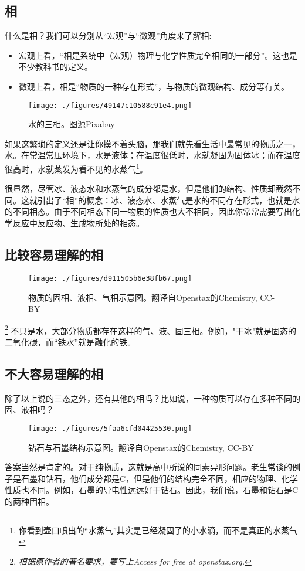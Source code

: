 
\subsection{相}
什么是相？我们可以分别从“宏观”与“微观”角度来了解相:
\begin{itemize}
\item 宏观上看，“相是系统中（宏观）物理与化学性质完全相同的一部分”。这也是不少教科书的定义。
\item 微观上看，相是“物质的一种存在形式”，与物质的微观结构、成分等有关。
\end{itemize}

\begin{figure}[ht]
\centering
\texttt{[image: ./figures/49147c10588c91e4.png]}
\caption{水的三相。图源Pixabay} \label{fig_PHS_1}
\end{figure}
如果这繁琐的定义还是让你摸不着头脑，那我们就先看生活中最常见的物质之一，水。在常温常压环境下，水是液体；在温度很低时，水就凝固为固体冰；而在温度很高时，水就蒸发为看不见的水蒸气\footnote{你看到壶口喷出的“水蒸气”其实是已经凝固了的小水滴，而不是真正的水蒸气}。

很显然，尽管冰、液态水和水蒸气的成分都是水，但是他们的结构、性质却截然不同。这就引出了“相”的概念：冰、液态水、水蒸气是水的不同存在形式，也就是水的不同相态。由于不同相态下同一物质的性质也大不相同，因此你常常需要写出化学反应中反应物、生成物所处的相态。

\subsection{比较容易理解的相}
\begin{figure}[ht]
\centering
\texttt{[image: ./figures/d911505b6e38fb67.png]}
\caption{物质的固相、液相、气相示意图。翻译自Openstax的Chemistry, CC-BY} \label{fig_PHS_2}
\end{figure}
\footnote{\textsl{根据原作者的著名要求，要写上Access for free at openstax.org.}}
不只是水，大部分物质都存在这样的气、液、固三相。例如，"干冰"就是固态的二氧化碳，而“铁水”就是融化的铁。

\subsection{不大容易理解的相}
除了以上说的三态之外，还有其他的相吗？比如说，一种物质可以存在多种不同的固、液相吗？

\begin{figure}[ht]
\centering
\texttt{[image: ./figures/5faa6cfd04425530.png]}
\caption{钻石与石墨结构示意图。翻译自Openstax的Chemistry, CC-BY} \label{fig_PHS_3}
\end{figure}
答案当然是肯定的。对于纯物质，这就是高中所说的同素异形问题。老生常谈的例子是石墨和钻石，他们成分都是C，但是他们的结构完全不同，相应的物理、化学性质也不同。例如，石墨的导电性远远好于钻石。因此，我们说，石墨和钻石是C的两种固相。

